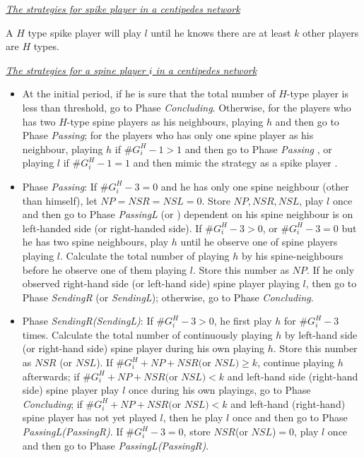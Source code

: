 \documentclass[12pt,letter]{article}
\theoremstyle{remark}
\theoremstyle{remark}
\theoremstyle{claim}
\begin{document}
\bigskip

\noindent\underline{\emph{The strategies for spike player in a centipedes network}}

A $H$ type spike player will play $l$ until he knows there are at least $k$ other players are $H$ types.

\bigskip

\noindent\underline{\emph{The strategies for a spine player $i$ in a centipedes network}}

\begin{itemize}
\item At the initial period, if he is sure that the total number of $H$-type player is less than threshold, go to Phase \textit{Concluding}. Otherwise, for the players who has two $H$-type spine players as his neighbours, playing $h$ and then go to Phase \textit{Passing}; for the players who has only one spine player as his neighbour, playing $h$ if $\#G^H_i-1>1$ and then go to Phase \textit{Passing} , or playing $l$ if $\#G^H_i-1=1$ and then mimic the strategy as a spike player .

\item Phase \textit{Passing}: If $\#G^H_i-3=0$ and he has only one spine neighbour (other than himself), let $NP=NSR=NSL=0$. Store $NP,NSR,NSL$, play $l$ once and then go to Phase \textit{PassingL} (or ) dependent on his spine neighbour is on left-handed side (or right-handed side). If $\#G^H_i-3>0$, or $\#G^H_i-3=0$ but he has two spine neighbours, play $h$ until he observe one of spine players playing $l$. Calculate the total number of playing $h$ by his spine-neighbours before he observe one of them playing $l$. Store this number as $NP$. If he only observed right-hand side (or left-hand side) spine player playing $l$, then go to Phase \textit{SendingR} (or \textit{SendingL}); otherwise, go to Phase \textit{Concluding}. 

\item Phase \textit{SendingR(SendingL)}: If $\#G^H_i-3>0$, he first play $h$ for $\#G^H_i-3$ times. Calculate the total number of continuously playing $h$ by left-hand side (or right-hand side) spine player during his own playing $h$. Store this number as $NSR$ (or $NSL$). If $\#G^H_i+NP+NSR($or $NSL)\geq k$, continue playing $h$ afterwards; if $\#G^H_i+NP+NSR($or $NSL)< k$ and left-hand side (right-hand side) spine player play $l$ once during his own playings, go to Phase \textit{Concluding}; if $\#G^H_i+NP+NSR($or $NSL)< k$ and left-hand (right-hand) spine player has not yet played $l$, then he play $l$ once and then go to Phase \textit{PassingL(PassingR)}. If $\#G^H_i-3=0$, store $NSR$(or $NSL$)$=0$, play $l$ once and then go to Phase \textit{PassingL(PassingR)}.



\end{itemize}
\end{document}
